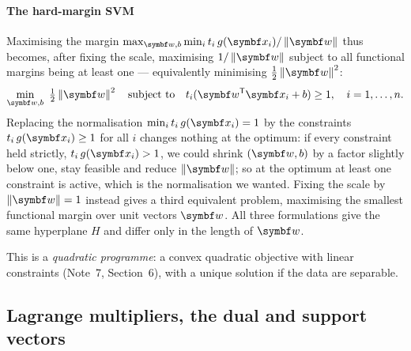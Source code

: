 \documentclass[11pt]{article}
\newcommand{\w}{\vect{w}}
\begin{document}
\paragraph{The hard-margin SVM} Maximising the margin $\max_{\w, b}\min_i t_i\,g(\x_i)/\norm{\w}$ thus becomes, after fixing the scale, maximising
$1/\norm{\w}$ subject to all functional margins being at least one --- equivalently minimising $\frac12\norm{\w}^2$:
\begin{equation}\label{eq:hardsvm}
  \min_{\w, b}\ \tfrac12 \norm{\w}^2 \quad \text{subject to} \quad t_i(\w\T\x_i + b) \ge 1, \quad i = 1, \dots, n .
\end{equation}
Replacing the normalisation $\min_i t_i\,g(\x_i) = 1$ by the constraints $t_i\,g(\x_i) \ge 1$ for all $i$ changes
nothing at the optimum: if every constraint held strictly, $t_i\,g(\x_i) > 1$, we could shrink $(\w, b)$ by a factor
slightly below one, stay feasible and reduce $\norm{\w}$; so at the optimum at least one constraint is active, which is
the normalisation we wanted. Fixing the scale by $\norm{\w} = 1$ instead gives a third equivalent problem, maximising the
smallest functional margin over unit vectors $\w$. All three formulations give the same hyperplane $H$ and differ only in
the length of $\w$.

This is a \emph{quadratic programme}: a convex quadratic objective with linear constraints (Note~7, Section~6), with a
unique solution if the data are separable.

\subsection{Lagrange multipliers, the dual and support vectors}\label{sec:svmdual}
\end{document}
